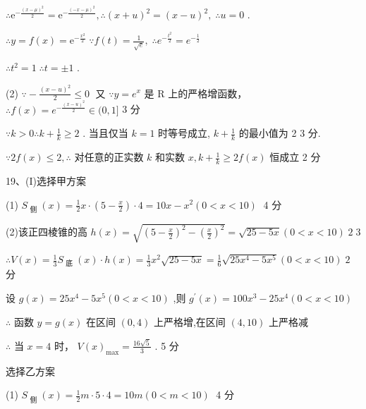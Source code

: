 \documentclass[10pt]{article}
\begin{document}
\(\therefore {\mathrm{e}}^{-\frac{{\left( x - \mu \right) }^{2}}{2}} = {\mathrm{e}}^{-\frac{{\left( -x - \mu \right) }^{2}}{2}},\therefore {\left( x + u\right) }^{2} = {\left( x - u\right) }^{2},\;\therefore u = 0\) .

\(\therefore y = f\left( x\right)  = {\mathrm{e}}^{-\frac{{x}^{2}}{2}}\;\because f\left( t\right)  = \frac{1}{\sqrt{e}},\;\therefore {e}^{-\frac{{t}^{2}}{2}} = {e}^{-\frac{1}{2}}\)

\(\therefore {t}^{2} = 1\;\therefore t =  \pm  1\) .

(2) \(\because  - \frac{{\left( x - u\right) }^{2}}{2} \leq  0\;\) 又 \(\because y = {e}^{x}\) 是 \(\mathrm{R}\) 上的严格增函数， \(\therefore f\left( x\right)  = {e}^{-\frac{{\left( x - u\right) }^{2}}{2}} \in  (0,1\rbrack\) 3 分

\(\because k > 0\therefore k + \frac{1}{k} \geq  2\) . 当且仅当 \(k = 1\) 时等号成立, \(k + \frac{1}{k}\) 的最小值为 2 3 分.

\(\because {2f}\left( x\right)  \leq  2,\therefore\) 对任意的正实数 \(k\) 和实数 \(x,k + \frac{1}{k} \geq  {2f}\left( x\right)\) 恒成立 2 分

19、(I)选择甲方案

(1) \({S}_{\text{ 侧 }}\left( x\right)  = \frac{1}{2}x \cdot  \left( {5 - \frac{x}{2}}\right)  \cdot  4 = {10x} - {x}^{2}\left( {0 < x < {10}}\right) \;\) 4 分

(2)该正四棱锥的高 \(h\left( x\right)  = \sqrt{{\left( 5 - \frac{x}{2}\right) }^{2} - {\left( \frac{x}{2}\right) }^{2}} = \sqrt{{25} - {5x}}\left( {0 < x < {10}}\right) \;2\;3\)

\(\therefore V\left( x\right)  = \frac{1}{3}{S}_{\text{ 底 }}\left( x\right)  \cdot  h\left( x\right)  = \frac{1}{3}{x}^{2}\sqrt{{25} - {5x}} = \frac{1}{6}\sqrt{{25}{x}^{4} - 5{x}^{5}}\left( {0 < x < {10}}\right) \;2\) 分

设 \(g\left( x\right)  = {25}{x}^{4} - 5{x}^{5}\left( {0 < x < {10}}\right)\) ,则 \({g}^{\prime }\left( x\right)  = {100}{x}^{3} - {25}{x}^{4}\left( {0 < x < {10}}\right)\)

\(\therefore\) 函数 \(y = g\left( x\right)\) 在区间 \(\left( {0,4}\right)\) 上严格增,在区间 \(\left( {4,{10}}\right)\) 上严格减

\(\therefore\) 当 \(x = 4\) 时， \(V{\left( x\right) }_{\max } = \frac{{16}\sqrt{5}}{3}\) . 5 分

选择乙方案

(1) \({S}_{\text{ 侧 }}\left( x\right)  = \frac{1}{2}m \cdot  5 \cdot  4 = {10m}\left( {0 < m < {10}}\right) \;\) 4 分
\end{document}
